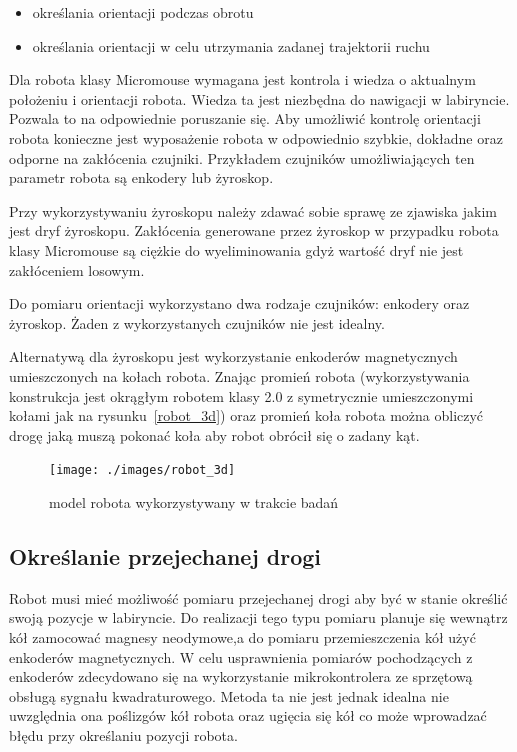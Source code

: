 \documentclass[12pt,a4paper,twoside,openright,fleqn]{mwrep}
\begin{document}
\begin{itemize}
    \item określania orientacji podczas obrotu 
    \item określania orientacji w celu utrzymania zadanej trajektorii ruchu
\end{itemize}

Dla robota klasy Micromouse wymagana jest kontrola i wiedza o aktualnym położeniu i orientacji robota. Wiedza ta jest niezbędna do nawigacji w labiryncie. Pozwala to na odpowiednie poruszanie się. Aby umożliwić kontrolę orientacji robota konieczne jest wyposażenie robota w odpowiednio szybkie, dokładne oraz odporne na zakłócenia czujniki. Przykładem  czujników umożliwiających ten parametr robota są enkodery lub żyroskop. 

Przy wykorzystywaniu żyroskopu należy zdawać sobie sprawę ze zjawiska jakim jest dryf żyroskopu. Zakłócenia generowane przez żyroskop w przypadku robota klasy Micromouse są ciężkie do wyeliminowania gdyż wartość dryf nie jest zakłóceniem losowym. 

Do pomiaru orientacji wykorzystano dwa rodzaje czujników: enkodery oraz żyroskop. Żaden z wykorzystanych czujników nie jest idealny. 

Alternatywą dla żyroskopu jest wykorzystanie enkoderów magnetycznych umieszczonych na kołach robota. Znając promień robota (wykorzystywania konstrukcja jest okrągłym robotem klasy 2.0 z symetrycznie umieszczonymi kołami jak na rysunku~\ref{robot_3d}) oraz promień koła robota można obliczyć drogę jaką muszą pokonać koła aby robot obrócił się o zadany kąt.

\begin{figure}[h]
\centering \texttt{[image: ./images/robot\_3d]}
\caption{model robota wykorzystywany w trakcie badań}
\end{figure}

\subsection{Określanie przejechanej drogi} %
Robot musi mieć możliwość pomiaru przejechanej drogi aby być w stanie określić swoją pozycje w labiryncie. Do realizacji tego typu pomiaru planuje się wewnątrz kół zamocować magnesy neodymowe,a do pomiaru przemieszczenia kół użyć enkoderów magnetycznych. W celu usprawnienia pomiarów pochodzących z enkoderów zdecydowano się na wykorzystanie mikrokontrolera ze sprzętową obsługą sygnału kwadraturowego. Metoda ta nie jest jednak idealna nie uwzględnia ona poślizgów kół robota oraz ugięcia się kół co może wprowadzać błędu przy określaniu pozycji robota. 
\end{document}
